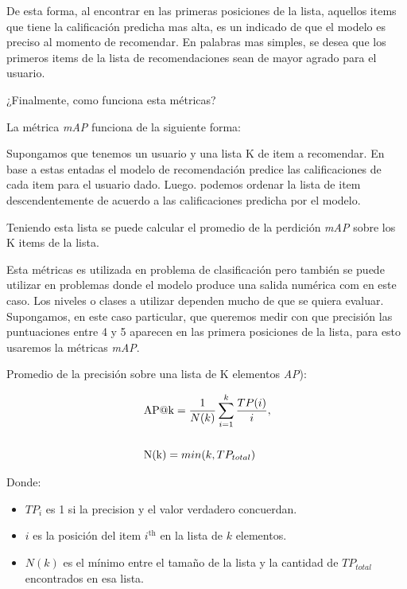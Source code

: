 \documentclass[11pt,a4paper,twoside]{thesis}
\begin{document}
De esta forma, al encontrar en las primeras posiciones de la lista, aquellos items que tiene la calificación predicha mas alta, es un indicado de que el modelo es preciso al momento de recomendar. En palabras mas simples, se desea que los primeros items de la lista de recomendaciones sean de mayor agrado para el usuario.

¿Finalmente, como funciona esta métricas?

La métrica \textit{mAP\makeatletter@k} funciona de la siguiente forma:

Supongamos que tenemos un usuario y una lista K de item a recomendar. En base a estas entadas el modelo de recomendación predice las calificaciones de cada item para el usuario dado. Luego. podemos ordenar la lista de item descendentemente de acuerdo a las calificaciones predicha por el modelo.

Teniendo esta lista se puede calcular el promedio de la perdición \textit{mAP\makeatletter@k} sobre los K items de la lista.

Esta métricas es utilizada en problema de clasificación pero también se puede utilizar en problemas donde el modelo produce una salida numérica com en este caso. Los niveles o clases a utilizar dependen mucho de que se quiera evaluar. Supongamos, en este caso particular, que queremos medir con que precisión las puntuaciones entre 4 y 5 aparecen en las primera posiciones de la lista, para esto usaremos la métricas \textit{mAP\makeatletter@k}.

\begin{description}
	\item[Promedio de la precisión sobre una lista de K elementos \textit{AP\makeatletter@k}):]
\end{description}
\begin{equation}
	\begin{split}
	& \operatorname{AP\makeatletter@k}=\frac{1}{N(k)} \sum_{i=1}^k \frac{ TP(i)}{i}, \\
	& \\
	& \operatorname{N(k)} = min(k, TP_{total}) \\
	\end{split}
\end{equation}
\begin{description}
	\item[Donde:]
\end{description}
\begin{itemize}
	\item $TP_i$ es 1 si la precision y el valor verdadero concuerdan.
	\item $i$ es la posición del item $i^\mathrm{th}$ en la lista de $k$ elementos.
	\item $N(k)$ es el mínimo entre el tamaño de la lista y la cantidad de $TP_{total}$ encontrados en esa lista.
\end{itemize}
\end{document}
